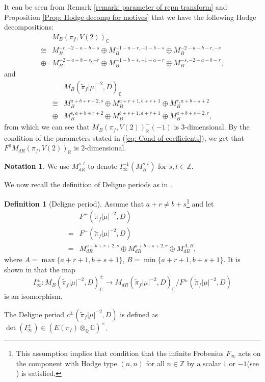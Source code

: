 \documentclass[11pt, a4paper]{amsart}
\theoremstyle{plain}
\theoremstyle{definition}
\newtheorem{definition}[theorem]{Definition}
\newtheorem{notation}[theorem]{Notation}
\numberwithin{equation}{section}
\def\CC{\mathbb{C}}
\def\QQ{\mathbb{Q}}
\def\RR{\mathbb{R}}
\def\ZZ{\mathbb{Z}}
\begin{document}
\par It can be seen from Remark \ref{remark: parameter of repn transform} and Proposition \ref{Prop: Hodge decomp for motives} that we have the following Hodge decompositions: 
     \begin{align*}
        & M_{B}({\pi}_f, V(2))_{\CC} \\
        \cong & M_{B}^{-r, -2-a-b-s} \oplus M_{B}^{-1-a-r, -1-b-s} \oplus M_{B}^{-2-a-b-r, -s} \\
        \oplus & M_{B}^{-2-a-b-s, -r} \oplus M_{B}^{-1-b-s, -1-a-r} \oplus M_{B}^{-s, -2-a-b-r}, 
    \end{align*} and 
    \begin{align*}
        & M_{B}(\tilde{\pi}_f|\mu|^{-2}, D)_{\CC} \\
        \cong & M_{B}^{a + b + r + 2, s} \oplus M_{B}^{a + r + 1, b + s + 1} \oplus M_{B}^{r, a + b + s + 2} \\
        \oplus & M_{B}^{s, a + b + r + 2} \oplus M_{B}^{b + s + 1, a + r + 1} \oplus M_{B}^{a + b + s + 2, r}, 
    \end{align*}
    from which we can see that 
    $M_{B}(\pi_f, V(2))^{-}_{\RR}(-1)$ is $3$-dimensional.
    By the condition of the parameters stated in (\ref{eq: Cond of coefficients}), we get that $F^{0}M_{dR}(\pi_f, V(2))_{\RR}$ is $2$-dimensional. 

    \begin{notation}
        We use $M_{dR}^{s, t}$ to denote $I_{\infty}^{-1} (M_{B}^{s, t})$ for $s, t \in \ZZ$.  
    \end{notation}

    We now recall the definition of Deligne periods as in \cite[\S 1.7]{Deligne79}. 
    \begin{definition}[Deligne period]
    \label{def: Deligne period}
    Assume that $a + r \neq b + s$\footnote{This assumption implies that condition that the infinite Frobenius $F_{\infty}$ acts on the component with Hodge type $(n, n)$ for all $n \in \ZZ$ by a scalar $1$ or $-1$(see \cite[\S 1.7]{Deligne79}) is satisfied. } and let 
    \begin{align*}
           & F^{+}(\tilde{\pi}_{f}|\mu|^{-2}, D) \\
         = & F^{-}(\tilde{\pi}_{f}|\mu|^{-2}, D) \\
         = & M_{dR}^{a + b + r + 2, s} \oplus M_{dR}^{a + b + s + 2, r} \oplus M_{dR}^{A, B},
    \end{align*}
    where $A = \max\{a + r + 1, b + s + 1\}$, $B = \min\{a + r + 1, b + s + 1\}$. 
    It is shown in \cite[\S 1.7]{Deligne79} that the map 
    \begin{equation*}
        I_{\infty}^{\pm} \colon M_{B}(\tilde{\pi}_{f}|\mu|^{-2}, D)_{\CC}^{\pm} \longrightarrow M_{dR}(\tilde{\pi}_{f}|\mu|^{-2}, D)_{\CC} / F^{\pm}(\tilde{\pi}_{f}|\mu|^{-2}, D)
    \end{equation*}
    is an isomorphism.
        \par The Deligne period $c^{\pm}(\tilde{\pi}_{f}|\mu|^{-2}, D)$ is defined as $\det(I_{\infty}^{\pm}) \in (E(\pi_f) \otimes_{\QQ} \CC)^{\times}$. 
\end{definition}
\end{document}
